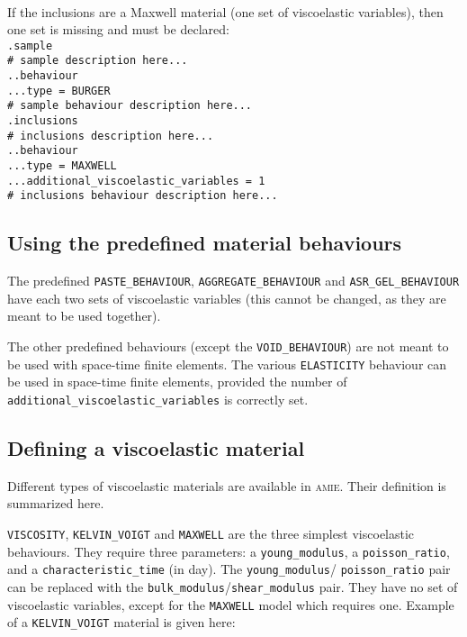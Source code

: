 \documentclass[10pt]{article}
\begin{document}
\paragraph{} If the inclusions are a Maxwell material (one set of viscoelastic variables), then one set is missing and must be declared:\\

\noindent \verb+.sample+\\
\verb+# sample description here...+\\
\verb+..behaviour+\\
\verb+...type = BURGER+\\
\verb+# sample behaviour description here...+\\
\verb+.inclusions+\\
\verb+# inclusions description here...+\\
\verb+..behaviour+\\
\verb+...type = MAXWELL+\\
\verb+...additional_viscoelastic_variables = 1+\\
\verb+# inclusions behaviour description here...+

\subsection{Using the predefined material behaviours}

The predefined \verb+PASTE_BEHAVIOUR+, \verb+AGGREGATE_BEHAVIOUR+ and \verb+ASR_GEL_BEHAVIOUR+ have each two sets of viscoelastic variables (this cannot be changed, as they are meant to be used together). 

The other predefined behaviours (except the \verb+VOID_BEHAVIOUR+) are not meant to be used with space-time finite elements. The various \verb+ELASTICITY+ behaviour can be used in space-time finite elements, provided the number of \verb+additional_viscoelastic_variables+ is correctly set.

\subsection{Defining a viscoelastic material}

Different types of viscoelastic materials are available in \textsc{amie}. Their definition is summarized here.

\verb+VISCOSITY+, \verb+KELVIN_VOIGT+ and \verb+MAXWELL+ are the three simplest viscoelastic behaviours. They require three parameters: a \verb+young_modulus+, a \verb+poisson_ratio+, and a \verb+characteristic_time+ (in day). The \verb+young_modulus+/ \verb+poisson_ratio+ pair can be replaced with the \verb+bulk_modulus+/\verb+shear_modulus+ pair. They have no set of viscoelastic variables, except for the \verb+MAXWELL+ model which requires one. Example of a \verb+KELVIN_VOIGT+ material is given here:\\
\end{document}
